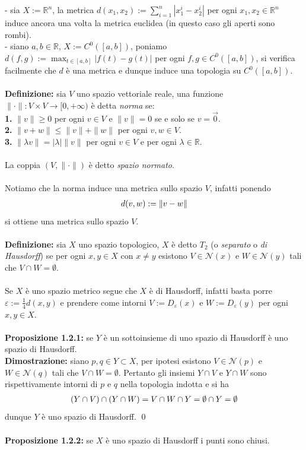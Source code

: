 \documentclass{article}
\begin{document}
- sia $X := \mathbb{R}^n$, la metrica $d(x_1, x_2) := \sum_{i = 1}^n |x_1^i - x_2^i|$ per ogni $x_1, x_2 \in \mathbb{R}^n$ induce ancora una volta la metrica euclidea (in questo caso gli aperti sono rombi). \\
- siano $a, b \in \mathbb{R}$, $X := C^0([a, b])$, poniamo $d(f, g) := \max_{t \in [a, b]} |f(t) - g(t)|$ per ogni $f, g \in C^0([a, b])$, si verifica facilmente che $d$ è una metrica e dunque induce una topologia su $C^0([a, b])$. \\ \\
\textbf{Definizione:} sia $V$ uno spazio vettoriale reale, una funzione $\| \cdot \| : V \times V \longrightarrow [0, +\infty)$ è detta \textit{norma} se: \\
\textbf{1.} $\| v \| \geq 0$ per ogni $v \in V$ e $\| v \| = 0$ se e solo se $v = \vec{0}$. \\
\textbf{2.} $\| v + w \| \leq \| v \| + \| w \|$ per ogni $v, w \in V$. \\
\textbf{3.} $\| \lambda v \| = |\lambda| \| v \|$ per ogni $v \in V$ e per ogni $\lambda \in \mathbb{R}$. \\ \\
La coppia $(V, \| \cdot \|)$ è detto \textit{spazio normato}. \\ \\
Notiamo che la norma induce una metrica sullo spazio $V$, infatti ponendo
\begin{gather}
    d(v, w) := \|v - w\| \notag
\end{gather}
si ottiene una metrica sullo spazio $V$. \\ \\
\textbf{Definizione:} sia $X$ uno spazio topologico, $X$ è detto $T_2$ (o \textit{separato} o \textit{di Hausdorff}) se per ogni $x, y \in X$ con $x \neq y$ esistono $V \in \mathcal{N}(x)$ e $W \in \mathcal{N}(y)$ tali che $V \cap W = \emptyset$. \\ \\
Se $X$ è uno spazio metrico segue che $X$ è di Hausdorff, infatti basta porre $\varepsilon := \frac{1}{4}d(x, y)$ e prendere come intorni $V := D_\varepsilon(x)$ e $W := D_\varepsilon(y)$ per ogni $x, y \in X$. \\ \\
\textbf{Proposizione 1.2.1:} se $Y$ è un sottoinsieme di uno spazio di Hausdorff è uno spazio di Hausdorff. \\

\textbf{Dimostrazione:} siano $p, q \in Y \subset X$, per ipotesi esistono $V \in \mathcal{N}(p)$ e $W \in \mathcal{N}(q)$ tali che $V \cap W = \emptyset$. Pertanto gli insiemi $Y \cap V$ e $Y \cap W$ sono rispettivamente intorni di $p$ e $q$ nella topologia indotta e si ha
\begin{gather}
    (Y \cap V) \cap (Y \cap W) = V \cap W \cap Y = \emptyset \cap Y = \emptyset \notag
\end{gather}
dunque $Y$ è uno spazio di Hausdorff. \qed \\ \\
\textbf{Proposizione 1.2.2:} se $X$ è uno spazio di Hausdorff i punti sono chiusi. \\
\end{document}
